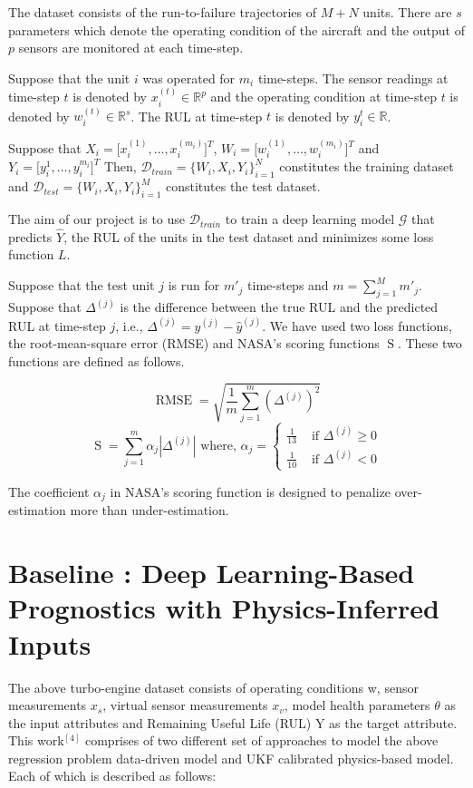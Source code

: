 \documentclass[a4paper,12pt]{article}
\DeclareMathOperator{\rmse}{RMSE}
\DeclareMathOperator{\nasa}{S}
\begin{document}
The dataset consists of the run-to-failure trajectories of $M+N$ units. There
are $s$ parameters which denote the operating condition of the aircraft and the
output of $p$ sensors are monitored at each time-step.

Suppose that the unit $i$ was operated for $m_i$ time-steps. The sensor
readings at time-step $t$ is denoted by $x_{i}^{(t)} \in \mathbb{R}^{p}$ and the
operating condition at time-step $t$ is denoted by
$w_{i}^{(t)} \in \mathbb{R}^{s}$. The RUL at time-step $t$ is denoted by
$y_{i}^{t} \in \mathbb{R}$.

Suppose that $X_i = \lbrack x_{i}^{(1)}, \ldots, x_{i}^{(m_i)} \rbrack^{T}$,
$W_i = \lbrack w_{i}^{(1)}, \ldots, w_{i}^{(m_i)} \rbrack^{T}$ and
$Y_i = \lbrack y_{i}^{1}, \ldots, y_{i}^{m_i} \rbrack^{T}$ Then,
$\mathcal{D}_{train} = \{W_i, X_i, Y_i\}_{i=1}^{N}$ constitutes the training
dataset and $\mathcal{D}_{test} = \{W_i, X_i, Y_i\}_{i=1}^{M}$ constitutes the
test dataset.

The aim of our project is to use $\mathcal{D}_{train}$ to train a deep learning
model $\mathcal{G}$ that predicts $\hat{Y}$, the RUL of the units in the
test dataset and minimizes some loss function $L$.

Suppose that the test unit $j$ is run for $m'_{j}$ time-steps and
$m = \sum_{j=1}^{M} m'_{j}$. Suppose that $\Delta^{(j)}$ is the difference
between the true RUL and the predicted RUL at time-step $j$, i.e.,
$\Delta^{(j)} = y^{(j)} - \hat{y}^{(j)}$. We have used two loss functions, the
root-mean-square error (RMSE) and NASA's scoring functions $\nasa$. These two
functions are defined as follows.

\[ \rmse = \sqrt{\frac{1}{m}\sum_{j=1}^{m}(\Delta^{(j)})^2} \]
\[ \nasa = \sum_{j=1}^{m}\alpha_{j}|\Delta^{(j)}| \mbox{ where, } \alpha_{j} = 
\left\{ \begin{array}{ll}
\frac{1}{13} & \mbox{ if } \Delta^{(j)} \geq 0 \\
\frac{1}{10} & \mbox{ if } \Delta^{(j)} < 0 \end{array} \right.\]

The coefficient $\alpha_{j}$ in NASA's scoring function is designed to
penalize over-estimation more than under-estimation.

\pagebreak

\section{Baseline : Deep Learning-Based Prognostics with Physics-Inferred Inputs}
The above turbo-engine dataset consists of operating conditions w, sensor measurements \(x_{s}\), virtual sensor measurements \(x_{v}\), model health parameters \(\theta\) as the input attributes and Remaining Useful Life (RUL) Y  as the target attribute.    
This work\(^{[4]}\) comprises of two different set of approaches to model the above regression problem data-driven model and UKF calibrated physics-based model.  Each of which is described as follows:
\end{document}
